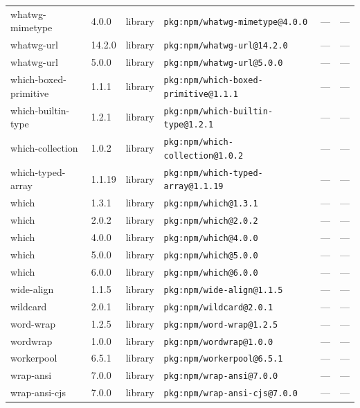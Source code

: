 \documentclass[11pt,a4paper]{article}
\begin{document}
\begin{longtable}{|p{4cm}|p{2cm}|p{1.6cm}|p{5cm}|p{1.5cm}|p{3.5cm}|}
\raggedright whatwg-mimetype & 4.0.0 & library & \small\texttt{pkg:npm/whatwg-mimetype@4.0.0} & — & \small — \\
\raggedright whatwg-url & 14.2.0 & library & \small\texttt{pkg:npm/whatwg-url@14.2.0} & — & \small — \\
\raggedright whatwg-url & 5.0.0 & library & \small\texttt{pkg:npm/whatwg-url@5.0.0} & — & \small — \\
\raggedright which-boxed-primitive & 1.1.1 & library & \small\texttt{pkg:npm/which-boxed-primitive@1.1.1} & — & \small — \\
\raggedright which-builtin-type & 1.2.1 & library & \small\texttt{pkg:npm/which-builtin-type@1.2.1} & — & \small — \\
\raggedright which-collection & 1.0.2 & library & \small\texttt{pkg:npm/which-collection@1.0.2} & — & \small — \\
\raggedright which-typed-array & 1.1.19 & library & \small\texttt{pkg:npm/which-typed-array@1.1.19} & — & \small — \\
\raggedright which & 1.3.1 & library & \small\texttt{pkg:npm/which@1.3.1} & — & \small — \\
\raggedright which & 2.0.2 & library & \small\texttt{pkg:npm/which@2.0.2} & — & \small — \\
\raggedright which & 4.0.0 & library & \small\texttt{pkg:npm/which@4.0.0} & — & \small — \\
\raggedright which & 5.0.0 & library & \small\texttt{pkg:npm/which@5.0.0} & — & \small — \\
\raggedright which & 6.0.0 & library & \small\texttt{pkg:npm/which@6.0.0} & — & \small — \\
\raggedright wide-align & 1.1.5 & library & \small\texttt{pkg:npm/wide-align@1.1.5} & — & \small — \\
\raggedright wildcard & 2.0.1 & library & \small\texttt{pkg:npm/wildcard@2.0.1} & — & \small — \\
\raggedright word-wrap & 1.2.5 & library & \small\texttt{pkg:npm/word-wrap@1.2.5} & — & \small — \\
\raggedright wordwrap & 1.0.0 & library & \small\texttt{pkg:npm/wordwrap@1.0.0} & — & \small — \\
\raggedright workerpool & 6.5.1 & library & \small\texttt{pkg:npm/workerpool@6.5.1} & — & \small — \\
\raggedright wrap-ansi & 7.0.0 & library & \small\texttt{pkg:npm/wrap-ansi@7.0.0} & — & \small — \\
\raggedright wrap-ansi-cjs & 7.0.0 & library & \small\texttt{pkg:npm/wrap-ansi-cjs@7.0.0} & — & \small — \\

\end{longtable}
\end{document}
